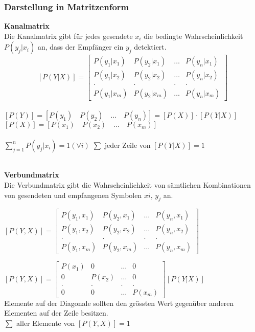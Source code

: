 \subsubsection{Darstellung in Matritzenform}
\begin{minipage}[t]{9cm}
	\textbf{Kanalmatrix}\\
	Die Kanalmatrix gibt für jedes gesendete $x_i$ die bedingte Wahrscheinlichkeit $P(y_j|x_i)$ an, dass der Empfänger ein $y_j$ detektiert.
 	$$ \boxed{[P(Y | X)] = \begin{bmatrix}
              P(y_1 | x_1) & P(y_2 | x_1) & \ldots & P(y_n | x_1) \\
              P(y_1 | x_2) & P(y_2 | x_2) & \ldots & P(y_n | x_2) \\
             . & . & . & . \\
              P(y_1 | x_m) & P(y_2 | x_m) & \ldots & P(y_n | x_m)
           \end{bmatrix}}$$ \\
	$ [P(Y)] = [P(y_1) \quad P(y_2) \quad \ldots \quad P(y_n)] = [P(X)] \cdot [P(Y|X)]$ \\
	$ [P(X)] = [P(x_1) \quad P(x_2) \quad \ldots \quad P(x_m)]$ \\ \\
	$\sum\limits_{j=1}^n P(y_j | x_i) = 1 (\forall i)$ \qquad $\sum$ jeder Zeile von $[P(Y|X)]=1$\\ \\
\end{minipage}
\hspace{0.5cm}
\begin{minipage}[t]{9cm}
	\textbf{Verbundmatrix}\\
	Die Verbundmatrix gibt die Wahrscheinlichkeit von sämtlichen Kombinationen von gesendeten und empfangenen Symbolen $xi$, $y_j$ an.
	\begin{center}$ \boxed{[P(Y,X)] = \begin{bmatrix}
              P(y_1, x_1) & P(y_2, x_1) & \ldots & P(y_n, x_1) \\
              P(y_1, x_2) & P(y_2, x_2) & \ldots & P(y_n, x_2) \\
             . & . & . & . \\
              P(y_1, x_m) & P(y_2, x_m) & \ldots & P(y_n, x_m)
           \end{bmatrix}}$
	\end{center}
	$  [P(Y,X)] =  \begin{bmatrix}
    	P(x_1) & 0 & \ldots & 0 \\
    	0 & P(x_2) & \ldots & 0 \\
    	. & . & . & . \\
    	0 & 0 & \ldots & P(x_m)
    \end{bmatrix} [P(Y|X)] $\\ 
	Elemente auf der Diagonale sollten den grössten Wert gegenüber anderen Elementen auf der Zeile
	besitzen. \\
	$\sum $ aller Elemente von $[P(Y,X)] = 1$
\end{minipage}

